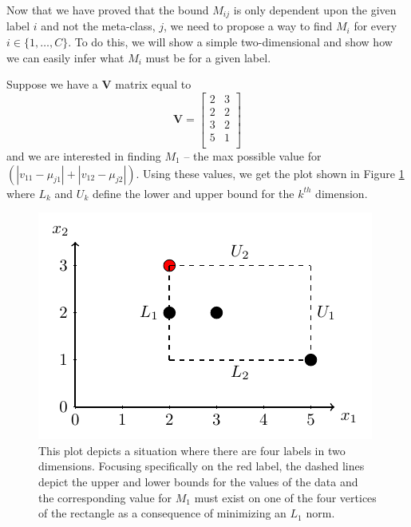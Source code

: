 \documentclass[../thesis.tex]{subfiles}
\begin{document}
Now that we have proved that the bound $M_{ij}$ is only dependent upon the given label $i$ and not the meta-class, $j$, we need to propose a way to find $M_i$ for every $i \in \{1, \ldots, C\}$. To do this, we will show a simple two-dimensional and show how we can easily infer what $M_i$ must be for a given label.

Suppose we have a $\mathbf{V}$ matrix equal to
\begin{equation*}
    \mathbf{V} =
    \begin{bmatrix}
        2 & 3 \\
        2 & 2 \\
        3 & 2 \\
        5 & 1 \\
    \end{bmatrix}
\end{equation*}
and we are interested in finding $M_1$ -- the max possible value for $\left(|v_{11} - \mu_{j1}| + |v_{12} - \mu_{j2}|\right)$. Using these values, we get the plot shown in Figure \ref{fig:big-m-plot} where $L_k$ and $U_k$ define the lower and upper bound for the $k^{th}$ dimension.

\begin{figure}
    \centering
    \includegraphics{images/big-m-plot.pdf}
    \caption[Big $M$ Inference Example]{This plot depicts a situation where there are four labels in two dimensions. Focusing specifically on the red label, the dashed lines depict the upper and lower bounds for the values of the data and the corresponding value for $M_1$ must exist on one of the four vertices of the rectangle as a consequence of minimizing an $L_1$ norm.}
    \label{fig:big-m-plot}
\end{figure}
\end{document}
